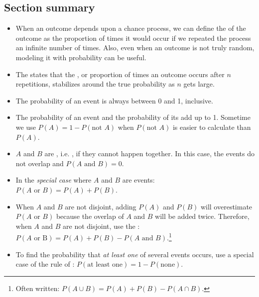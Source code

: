 \subsection*{Section summary}

\begin{itemize}

\item When an outcome depends upon a chance process, we can define the  of the outcome as the proportion of times it would occur if we repeated the process an infinite number of times.  Also, even when an outcome is not truly random, modeling it with probability can be useful.

\item The  states that the , or proportion of times an outcome occurs after $n$ repetitions, stabilizes around the true probability as $n$ gets large.

\item The probability of an event is always between 0 and 1, inclusive.

\item The probability of an event and the probability of its  add up to 1.  Sometime we use $P(A) = 1- P(\text{not } A)$ when $P(\text{not }A)$ is easier to calculate than $P(A)$.

\item $A$ and $B$ are , i.e. , if they cannot happen together.  In this case, the events do not overlap and $P(A \text { and } B) = 0$.

\item In the \emph{special case} where $A$ and $B$ are  events:  $P(A \text{ or } B) = P(A) + P(B)$.  

\item When $A$ and $B$ are not disjoint, adding $P(A)$ and $P(B)$ will overestimate $P(A \text{ or } B)$ because the overlap of $A$ and $B$ will be added twice.  Therefore, when $A$ and $B$ are not disjoint, use the :  \\$P(A \text{ or  B}) = P(A) + P(B) - P(A \text{ and } B)$.\footnote{Often written: $P(A \cup B) = P(A) + P(B) - P(A \cap B)$.} 

\item To find the probability that \emph{at least one} of several events occurs, use a special case of the rule of :  $P(\text{at least one}) = 1- P(\text{none})$.  


\end{itemize}
